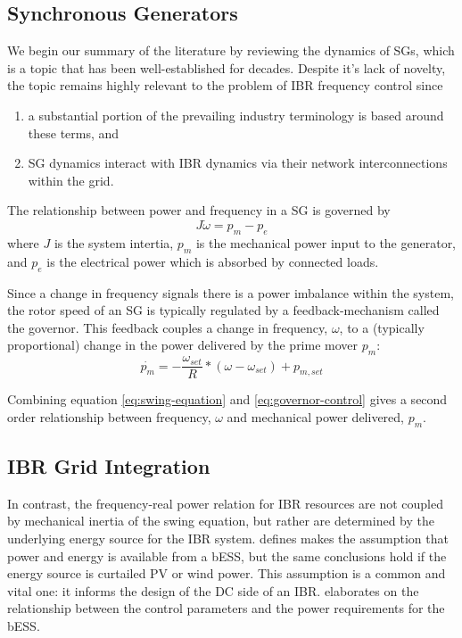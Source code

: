 

\label{sec:math-models}

\subsection{Synchronous Generators}
 We begin our summary of the literature by reviewing the dynamics of SGs, 
 which is a topic that has been well-established
 for decades. Despite it's lack of novelty, the topic remains highly
 relevant to the problem of IBR frequency control since
 \begin{enumerate}
  \item a substantial portion of the prevailing industry terminology
    is based around these terms, and
  \item SG dynamics interact with IBR dynamics via their network
    interconnections within the grid.
 \end{enumerate}


 The relationship between power and frequency in a SG is governed by
 \begin{equation}
  J\dot{\omega} = p_m - p_e
  \label{eq:swing-equation}
 \end{equation}
 where $J$ is the system intertia, $p_m$ is the mechanical power input to
 the generator, and $p_e$ is the electrical power which is absorbed
 by connected loads.

Since a change in frequency signals there is a power imbalance within the
system, the rotor speed of an SG is typically regulated by a
feedback-mechanism called the governor. This feedback couples a change in 
frequency, $\omega$, to a (typically proportional) change in the power
delivered by the prime mover $p_m$:
\begin{equation}
  \dot{p_m} = - \frac{\omega_{set}}{R} * (\omega - \omega_{set}) + p_{m,set}
  \label{eq:governor-control}
\end{equation}

Combining equation \ref{eq:swing-equation} and \ref{eq:governor-control}
gives a second order relationship between frequency, $\omega$ and 
mechanical power delivered, $p_m$.
 
\subsection{IBR Grid Integration}
In contrast, the frequency-real power relation for IBR resources are not
coupled by mechanical inertia of the swing equation,
but rather are determined by the underlying energy source for the IBR system.
defines makes the assumption that power and energy is available from a bESS,
but the same conclusions hold if the energy source is curtailed PV or wind power.
This assumption is a common and vital one: it informs the design of
the DC side of an IBR. %
elaborates on the relationship between the control parameters and
the power requirements for the bESS.

